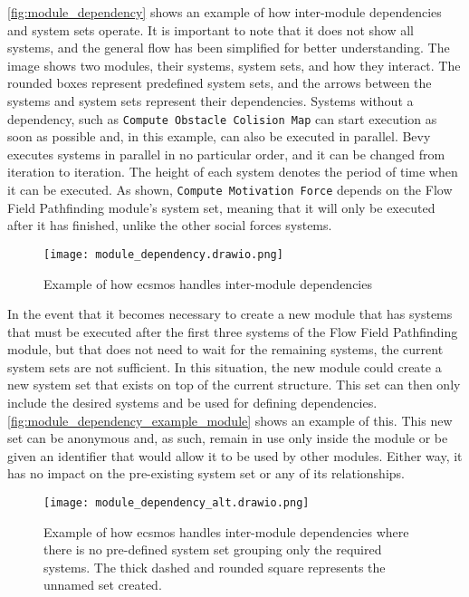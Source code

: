 \documentclass[twoside, 11pt]{article}
\begin{document}
\autoref{fig:module_dependency} shows an example of how inter-module dependencies and system sets operate. It is important to note that it does not show all systems, and the general flow has been simplified for better understanding. The image shows two modules, their systems, system sets, and how they interact. The rounded boxes represent predefined system sets, and the arrows between the systems and system sets represent their dependencies. Systems without a dependency, such as \verb|Compute Obstacle Colision Map| can start execution as soon as possible and, in this example, can also be executed in parallel. Bevy executes systems in parallel in no particular order, and it can be changed from iteration to iteration. The height of each system denotes the period of time when it can be executed. As shown, \verb|Compute Motivation Force| depends on the Flow Field Pathfinding module's system set, meaning that it will only be executed after it has finished, unlike the other social forces systems.

\begin{figure}[h]
  \centering
  \texttt{[image: module\_dependency.drawio.png]}
  \caption[Example of how ECSMoS handles inter-module dependencies]{Example of how \gls{ecsmos} handles inter-module dependencies}
  \label{fig:module_dependency}
\end{figure}

In the event that it becomes necessary to create a new module that has systems that must be executed after the first three systems of the Flow Field Pathfinding module, but that does not need to wait for the remaining systems, the current system sets are not sufficient. In this situation, the new module could create a new system set that exists on top of the current structure. This set can then only include the desired systems and be used for defining dependencies. 
\autoref{fig:module_dependency_example_module} shows an example of this. This new set can be anonymous and, as such, remain in use only inside the module or be given an identifier that would allow it to be used by other modules. Either way, it has no impact on the pre-existing system set or any of its relationships.

\begin{figure}[h]
  \centering
  \texttt{[image: module\_dependency\_alt.drawio.png]}
  \caption[Example of how ECSMoS handles the addition of systems with dependencies]{Example of how \gls{ecsmos} handles inter-module dependencies where there is no pre-defined system set grouping only the required systems. The thick dashed and rounded square represents the unnamed set created.}
  \label{fig:module_dependency_example_module}
\end{figure}
\end{document}
